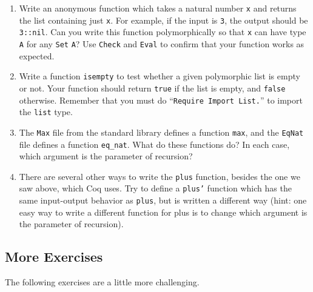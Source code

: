 \documentclass{book}[12pt]
\begin{document}
\begin{enumerate}
\item Write an anonymous function which takes a natural number
\texttt{x} and returns the list containing just \texttt{x}.  For
example, if the input is \texttt{3}, the output should be
\texttt{3::nil}.  Can you write this function polymorphically so that
\texttt{x} can have type \texttt{A} for any \texttt{Set} \texttt{A}?
Use \texttt{Check} and \texttt{Eval} to confirm that your function
works as expected.

\item Write a function \texttt{isempty} to test whether a given
polymorphic list is empty or not.  Your function should return
\texttt{true} if the list is empty, and \texttt{false} otherwise.
Remember that you must do ``\texttt{Require Import List.}'' to 
import the \texttt{list} type. 

\item The \texttt{Max} file from the standard library defines a
function \texttt{max}, and the \texttt{EqNat} file defines a function
\texttt{eq\_nat}.  What do these functions do?  In each case, which
argument is the parameter of recursion?

\item There are several other ways to write the \texttt{plus}
function, besides the one we saw above, which Coq uses.  Try to define
a \texttt{plus'} function which has the same input-output behavior
as \texttt{plus}, but is written a different way (hint: one easy way
to write a different function for plus is to change which argument
is the parameter of recursion).
\end{enumerate}

\subsection{More Exercises}

The following exercises are a little more challenging.
\end{document}
